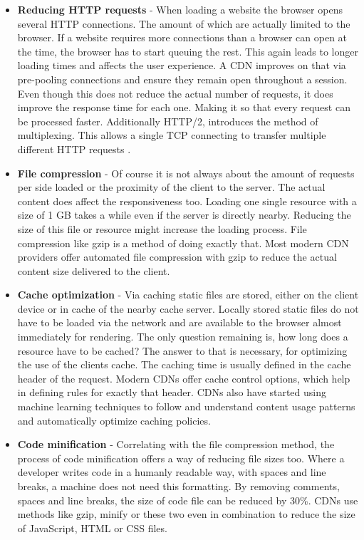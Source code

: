 \begin{itemize}
	\item \textbf{Reducing HTTP requests} - When loading a website the browser opens several HTTP connections. The amount of which are actually limited to the browser. If a website requires more connections than a browser can open at the time, the browser has to start queuing the rest. This again leads to longer loading times and affects the user experience. A CDN improves on that via pre-pooling connections and ensure they remain open throughout a session. Even though this does not reduce the actual number of requests, it does improve the response time for each one. Making it so that every request can be processed faster. Additionally HTTP/2, introduces the method of multiplexing. This allows a single TCP connecting to transfer multiple different HTTP requests \cite{http2}.
	
	\item \textbf{File compression} - Of course it is not always about the amount of requests per side loaded or the proximity of the client to the server. The actual content does affect the responsiveness too. Loading one single resource with a size of 1 GB takes a while even if the server is directly nearby. Reducing the size of this file or resource might increase the loading process. File compression like gzip is a method of doing exactly that. Most modern CDN providers offer automated file compression with gzip to reduce the actual content size delivered to the client.
	
	\item \textbf{Cache optimization} - Via caching static files are stored, either on the client device or in cache of the nearby cache server. Locally stored static files do not have to be loaded via the network and are available to the browser almost immediately for rendering. The only question remaining is, how long does a resource have to be cached? The answer to that is necessary, for optimizing the use of the clients cache. The caching time is usually defined in the cache header of the request. Modern CDNs offer cache control options, which help in defining rules for exactly that header.
	CDNs also have started using machine learning techniques to follow and understand content usage patterns and automatically optimize caching policies.
	 
	\item \textbf{Code minification} - Correlating with the file compression method, the process of code minification offers a way of reducing file sizes too. Where a developer writes code in a humanly readable way, with spaces and line breaks, a machine does not need this formatting. By removing comments, spaces and line breaks, the size of code file can be reduced by 30\%. CDNs use methods like gzip, minify or these two even in combination to reduce the size of JavaScript, HTML or CSS files.
	

\end{itemize}
